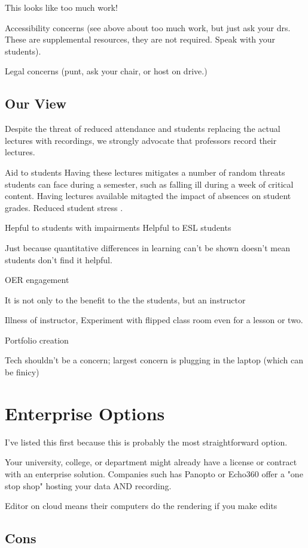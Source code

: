 \documentclass[sigconf]{acmart}
\begin{document}
This looks like too much work!

Accessibility concerns (see above about too much work, but just ask your drs.  These are supplemental resources, they are not required.  Speak with your students).

Legal concerns (punt, ask your chair, or host on drive.)


\subsection{Our View}
Despite the threat of reduced attendance and students replacing the actual lectures with recordings, we strongly advocate that professors record their lectures.


Aid to students
Having these lectures mitigates a number of random threats students can face during a semester, such as falling ill during a week of critical content.
Having lectures available mitagted the impact of absences on student grades\cite{traphagan2010impact}.
Reduced student stress \cite{traphagan2010impact}.

Hepful to students with impairments 
Helpful to ESL students


Just because quantitative differences in learning can't be shown doesn't mean students don't find it helpful.


OER engagement \cite{llamas2014generating}


It is not only to the benefit to the the students, but an instructor

Illness of instructor, 
Experiment with flipped class room even for a lesson or two.

Portfolio creation

Tech shouldn't be a concern; largest concern is plugging in the laptop (which can be finicy)

\section{Enterprise Options}
\label{enter}
I've listed this first because this is probably the most straightforward option.

Your university, college, or department might already have a license or contract with an enterprise solution.
Companies such has Panopto or Echo360 offer a "one stop shop" hosting your data AND recording.


Editor on cloud means their computers do the rendering if you make edits

\subsection{Cons}
\end{document}
